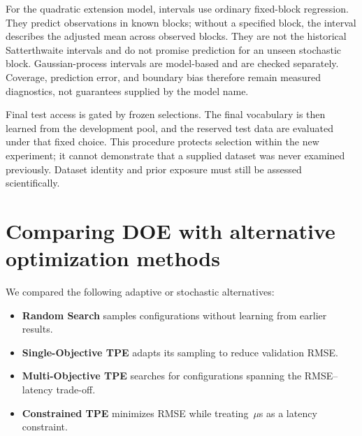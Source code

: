 \documentclass[12pt,a4paper]{article}
\newcommand{\term}[1]{\textbf{#1}}
\begin{document}
For the quadratic extension model, intervals use ordinary fixed-block regression. They predict observations in known blocks; without a specified block, the interval describes the adjusted mean across observed blocks. They are not the historical Satterthwaite intervals and do not promise prediction for an unseen stochastic block. Gaussian-process intervals are model-based and are checked separately. Coverage, prediction error, and boundary bias therefore remain measured diagnostics, not guarantees supplied by the model name.

Final test access is gated by frozen selections. The final vocabulary is then learned from the development pool, and the reserved test data are evaluated under that fixed choice. This procedure protects selection within the new experiment; it cannot demonstrate that a supplied dataset was never examined previously. Dataset identity and prior exposure must still be assessed scientifically.

\clearpage
\section{Comparing DOE with alternative optimization methods}
We compared the following adaptive or stochastic alternatives:
\begin{itemize}
\item \term{Random Search} samples configurations without learning from earlier results.
\item \term{Single-Objective TPE} adapts its sampling to reduce validation RMSE.
\item \term{Multi-Objective TPE} searches for configurations spanning the RMSE--latency trade-off.
\item \term{Constrained TPE} minimizes RMSE while treating \numPubLatencyLimit\,$\mu$s as a latency constraint.
\end{itemize}
\end{document}

